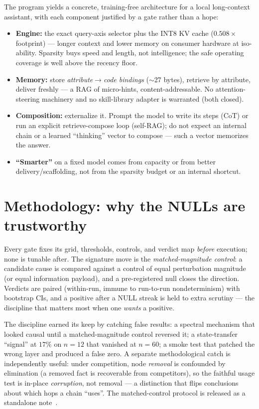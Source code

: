 \documentclass[11pt]{article}
\begin{document}
The program yields a concrete, training-free architecture for a local long-context
assistant, with each component justified by a gate rather than a hope:
\begin{itemize}
\item \textbf{Engine:} the exact query-axis selector plus the INT8 KV cache
($0.508\times$ footprint) --- longer context and lower memory on consumer hardware at
iso-ability. Sparsity buys speed and length, not intelligence; the safe operating
coverage is well above the recency floor.
\item \textbf{Memory:} store \emph{attribute$\to$code bindings} ($\sim$27 bytes),
retrieve by attribute, deliver freshly --- a RAG of micro-hints, content-addressable.
No attention-steering machinery and no skill-library adapter is warranted (both closed).
\item \textbf{Composition:} externalize it. Prompt the model to write its steps (CoT)
or run an explicit retrieve-compose loop (self-RAG); do not expect an internal chain or
a learned ``thinking'' vector to compose --- such a vector memorizes the answer.
\item \textbf{``Smarter''} on a fixed model comes from capacity or from better
delivery/scaffolding, not from the sparsity budget or an internal shortcut.
\end{itemize}

\section{Methodology: why the NULLs are trustworthy}
\label{sec:method}

Every gate fixes its grid, thresholds, controls, and verdict map \emph{before}
execution; none is tunable after. The signature move is the \emph{matched-magnitude
control}: a candidate cause is compared against a control of equal perturbation
magnitude (or equal information payload), and a pre-registered null closes the
direction. Verdicts are paired (within-run, immune to run-to-run nondeterminism) with
bootstrap CIs, and a positive after a NULL streak is held to extra scrutiny --- the
discipline that matters most when one \emph{wants} a positive.

The discipline earned its keep by catching false results: a spectral mechanism that
looked causal until a matched-magnitude control reversed it; a state-transfer ``signal''
at $17\%$ on $n{=}12$ that vanished at $n{=}60$; a smoke test that patched the wrong
layer and produced a false zero. A separate methodological catch is independently
useful: under competition, node \emph{removal} is confounded by elimination (a removed
fact is recoverable from competitors), so the faithful usage test is in-place
\emph{corruption}, not removal --- a distinction that flips conclusions about which hops
a chain ``uses''. The matched-control protocol is released as a standalone
note~\cite{matchedcontrols2026}.
\end{document}
